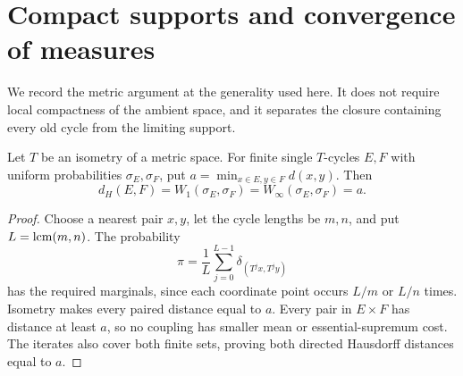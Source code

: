 \section{Compact supports and convergence of measures}
\label{sec:compact}

We record the metric argument at the generality used here. It does
not require local compactness of the ambient space, and it separates
the closure containing every old cycle from the limiting support.

\begin{lemma}\label{lem:exact-distances}
Let $T$ be an isometry of a metric space. For finite single $T$-cycles
$E,F$ with uniform probabilities $\sigma_E,\sigma_F$, put
$a=\min_{x\in E,y\in F}d(x,y)$. Then
\begin{equation}\label{eq:exact-distances}
 d_H(E,F)=W_1(\sigma_E,\sigma_F)
        =W_\infty(\sigma_E,\sigma_F)=a.
\end{equation}
\end{lemma}
\begin{proof}
Choose a nearest pair $x,y$, let the cycle lengths be $m,n$, and put
$L=\operatorname{lcm}(m,n)$. The probability
\[
 \pi=\frac1L\sum_{j=0}^{L-1}\delta_{(T^jx,T^jy)}
\]
has the required marginals, since each coordinate point occurs
$L/m$ or $L/n$ times. Isometry makes every paired distance equal
to $a$. Every pair in $E\times F$ has distance at least $a$, so no
coupling has smaller mean or essential-supremum cost. The iterates
also cover both finite sets, proving both directed Hausdorff
distances equal to $a$.
\end{proof}

